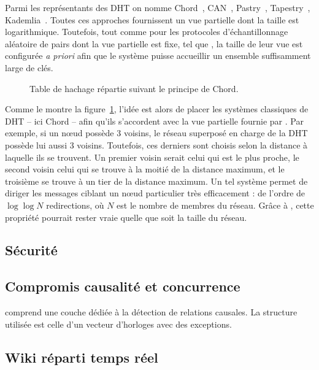 Parmi les représentants des DHT on nomme Chord~\cite{stoica2001chord},
CAN~\cite{ratnasamy2001scalable}, Pastry~\cite{rowstron2001pastry},
Tapestry~\cite{zhao2006tapestry}, Kademlia~\cite{maymounkov2002kademlia}.
Toutes ces approches fournissent un vue partielle dont la taille est
logarithmique. Toutefois, tout comme pour les protocoles d'échantillonnage
aléatoire de pairs dont la vue partielle est fixe, tel que \CYCLON, la taille de
leur vue est configurée \emph{a priori} afin que le système puisse accueillir un
ensemble suffisamment large de clés.

\begin{figure}
  \begin{center}
    
    \caption{\label{conclu:fig:dhtexample}Table de hachage répartie suivant le
      principe de Chord.}
  \end{center}
\end{figure}

Comme le montre la figure~\ref{conclu:fig:dhtexample}, l'idée est alors de
placer les systèmes classiques de DHT -- ici Chord -- afin qu'ils s'accordent
avec la vue partielle fournie par \SPRAY. Par exemple, si un nœud \SPRAY possède
3 voisins, le réseau superposé en charge de la DHT possède lui aussi 3
voisins. Toutefois, ces derniers sont choisis selon la distance à laquelle ils
se trouvent. Un premier voisin serait celui qui est le plus proche, le second
voisin celui qui se trouve à la moitié de la distance maximum, et le troisième
se trouve à un tier de la distance maximum. Un tel système permet de diriger les
messages ciblant un nœud particulier très efficacement : de l'ordre de
$\log\log N$ redirections, où $N$ est le nombre de membres du réseau. Grâce à
\SPRAY, cette propriété pourrait rester vraie quelle que soit la taille du
réseau.

\subsection{Sécurité}

\subsection{Compromis causalité et concurrence}

\CRATE comprend une couche dédiée à la détection de relations causales. La
structure utilisée est celle d'un vecteur d'horloges avec des exceptions. 


\subsection{Wiki réparti temps réel}

